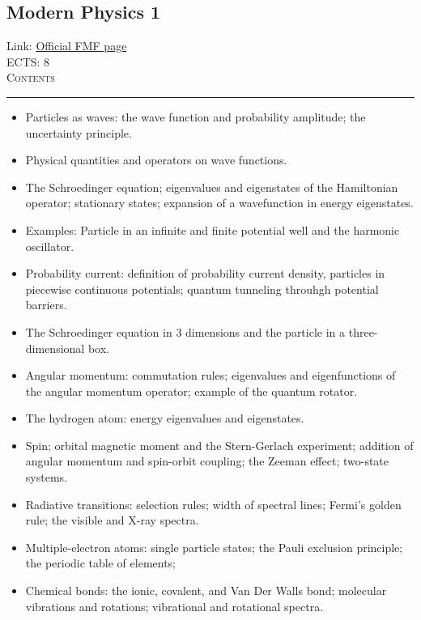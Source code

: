 \documentclass[11pt, a4paper]{article}
\newenvironment{course}[3]{
\subsection{#1}%
Link: \href{#2}{Official FMF page}\\%
ECTS: #3%
\vspace{1ex}
\\
{\large \textsc{Contents}}\\[-0.9ex]%
\rule{\textwidth}{0.5pt}
\vspace{-3ex}
}
{}
\newenvironment{chapter}[1]{
\begin{tcolorbox}[title=#1, breakable]
}
{\end{tcolorbox}}
\begin{document}
\begin{course}{Modern Physics 1}{https://www.fmf.uni-lj.si/en/study-physics/programmes/1fiz/2020/7000777/courses/1161/}{8}
\begin{chapter}{Quantum physics}
\begin{itemize}
            \item Particles as waves: the wave function and probability amplitude; the uncertainty principle.

            \item Physical quantities and operators on wave functions.

            \item The Schroedinger equation; eigenvalues and eigenstates of the Hamiltonian operator; stationary states;  expansion of a wavefunction in energy eigenstates.

            \item Examples: Particle in an infinite and finite potential well and the harmonic oscillator.

            \item Probability current: definition of probability current density, particles in piecewise continuous potentials; quantum tunneling throuhgh potential barriers.

            \item The Schroedinger equation in 3 dimensions and the particle in a three-dimensional box. 

            \item Angular momentum: commutation rules; eigenvalues and eigenfunctions of the angular momentum operator; example of the quantum rotator.

            \item The hydrogen atom: energy eigenvalues and eigenstates.

            \item Spin; orbital magnetic moment and the Stern-Gerlach experiment; addition of angular momentum and spin-orbit coupling; the Zeeman effect; two-state systems.

            \item Radiative transitions: selection rules; width of spectral lines; Fermi's golden rule; the visible and X-ray spectra.

            \item Multiple-electron atoms: single particle states; the Pauli exclusion principle; the periodic table of elements; 

            \item Chemical bonds: the ionic, covalent, and Van Der Walls bond; molecular vibrations and rotations; vibrational and rotational spectra.

        \end{itemize}
    \end{chapter}

\end{course}
\end{document}
